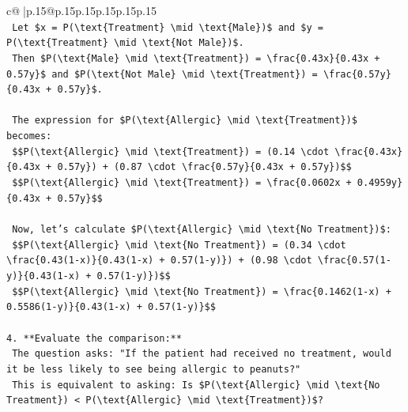 \documentclass{article}
\begin{document}
{\begin{supertabular}{c@{$\;$}|p{.15\linewidth}@{}p{.15\linewidth}p{.15\linewidth}p{.15\linewidth}p{.15\linewidth}p{.15\linewidth}}
{{{\\ 
\texttt{    Let \$x = P(\textbackslash{}text\{Treatment\} \textbackslash{}mid \textbackslash{}text\{Male\})\$ and \$y = P(\textbackslash{}text\{Treatment\} \textbackslash{}mid \textbackslash{}text\{Not Male\})\$.} \\
\texttt{    Then \$P(\textbackslash{}text\{Male\} \textbackslash{}mid \textbackslash{}text\{Treatment\}) = \textbackslash{}frac\{0.43x\}\{0.43x + 0.57y\}\$ and \$P(\textbackslash{}text\{Not Male\} \textbackslash{}mid \textbackslash{}text\{Treatment\}) = \textbackslash{}frac\{0.57y\}\{0.43x + 0.57y\}\$.} \\
\\ 
\texttt{    The expression for \$P(\textbackslash{}text\{Allergic\} \textbackslash{}mid \textbackslash{}text\{Treatment\})\$ becomes:} \\
\texttt{    \$\$P(\textbackslash{}text\{Allergic\} \textbackslash{}mid \textbackslash{}text\{Treatment\}) = (0.14 \textbackslash{}cdot \textbackslash{}frac\{0.43x\}\{0.43x + 0.57y\}) + (0.87 \textbackslash{}cdot \textbackslash{}frac\{0.57y\}\{0.43x + 0.57y\})\$\$} \\
\texttt{    \$\$P(\textbackslash{}text\{Allergic\} \textbackslash{}mid \textbackslash{}text\{Treatment\}) = \textbackslash{}frac\{0.0602x + 0.4959y\}\{0.43x + 0.57y\}\$\$} \\
\\ 
\texttt{    Now, let's calculate \$P(\textbackslash{}text\{Allergic\} \textbackslash{}mid \textbackslash{}text\{No Treatment\})\$:} \\
\texttt{    \$\$P(\textbackslash{}text\{Allergic\} \textbackslash{}mid \textbackslash{}text\{No Treatment\}) = (0.34 \textbackslash{}cdot \textbackslash{}frac\{0.43(1{-}x)\}\{0.43(1{-}x) + 0.57(1{-}y)\}) + (0.98 \textbackslash{}cdot \textbackslash{}frac\{0.57(1{-}y)\}\{0.43(1{-}x) + 0.57(1{-}y)\})\$\$} \\
\texttt{    \$\$P(\textbackslash{}text\{Allergic\} \textbackslash{}mid \textbackslash{}text\{No Treatment\}) = \textbackslash{}frac\{0.1462(1{-}x) + 0.5586(1{-}y)\}\{0.43(1{-}x) + 0.57(1{-}y)\}\$\$} \\
\\ 
\texttt{4.  **Evaluate the comparison:**} \\
\texttt{    The question asks: "If the patient had received no treatment, would it be less likely to see being allergic to peanuts?"} \\
\texttt{    This is equivalent to asking: Is \$P(\textbackslash{}text\{Allergic\} \textbackslash{}mid \textbackslash{}text\{No Treatment\}) < P(\textbackslash{}text\{Allergic\} \textbackslash{}mid \textbackslash{}text\{Treatment\})\$?} \\
}}}
\end{supertabular}}
\end{document}

